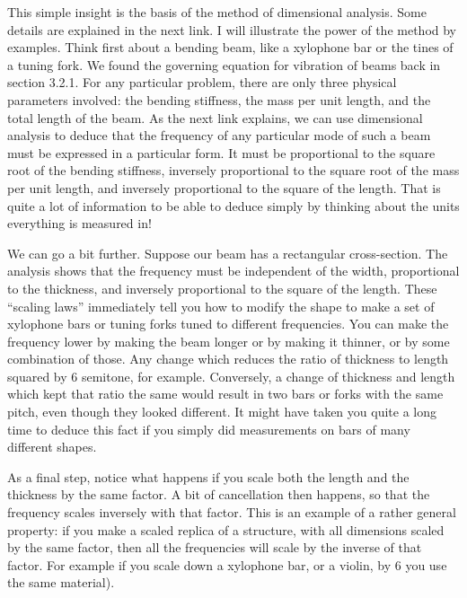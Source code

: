   This simple insight is the basis of the method of dimensional analysis. Some 
  details are explained in the next link. I will illustrate the power of the 
  method by examples. Think first about a bending beam, like a xylophone bar or 
  the tines of a tuning fork. We found the governing equation for vibration of 
  beams back in section 3.2.1. For any particular problem, there are only three 
  physical parameters involved: the bending stiffness, the mass per unit 
  length, and the total length of the beam. As the next link explains, we can 
  use dimensional analysis to deduce that the frequency of any particular mode 
  of such a beam must be expressed in a particular form. It must be 
  proportional to the square root of the bending stiffness, inversely 
  proportional to the square root of the mass per unit length, and inversely 
  proportional to the square of the length. That is quite a lot of information 
  to be able to deduce simply by thinking about the units everything is 
  measured in! 

  We can go a bit further. Suppose our beam has a rectangular cross-section. 
  The analysis shows that the frequency must be independent of the width, 
  proportional to the thickness, and inversely proportional to the square of 
  the length. These “scaling laws” immediately tell you how to modify the shape 
  to make a set of xylophone bars or tuning forks tuned to different 
  frequencies. You can make the frequency lower by making the beam longer or by 
  making it thinner, or by some combination of those. Any change which reduces 
  the ratio of thickness to length squared by 6%
  semitone, for example. Conversely, a change of thickness and length which 
  kept that ratio the same would result in two bars or forks with the same 
  pitch, even though they looked different. It might have taken you quite a 
  long time to deduce this fact if you simply did measurements on bars of many 
  different shapes. 

  As a final step, notice what happens if you scale both the length and the 
  thickness by the same factor. A bit of cancellation then happens, so that the 
  frequency scales inversely with that factor. This is an example of a rather 
  general property: if you make a scaled replica of a structure, with all 
  dimensions scaled by the same factor, then all the frequencies will scale by 
  the inverse of that factor. For example if you scale down a xylophone bar, or 
  a violin, by 6%
  you use the same material). 

